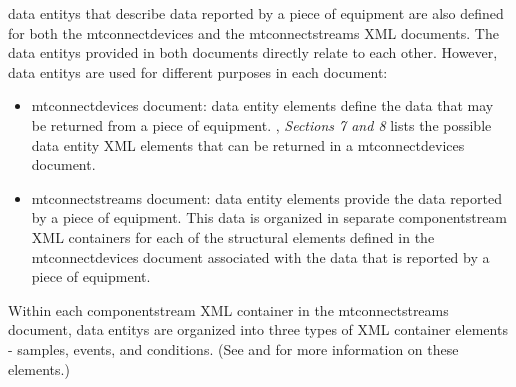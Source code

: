\glspl{data entity} that describe data reported by a piece of equipment are also defined for both the \gls{mtconnectdevices} and the \gls{mtconnectstreams} XML documents.  The \glspl{data entity} provided in both documents directly relate to each other.  However, \glspl{data entity} are used for different purposes in each document:

\begin{itemize}
\item \gls{mtconnectdevices} document: \gls{data entity} elements define the data that may be returned from a piece of equipment.  , \textit{Sections 7 and 8} lists the possible \gls{data entity} XML elements that can be returned in a \gls{mtconnectdevices} document.  

\item \gls{mtconnectstreams} document: \gls{data entity} elements provide the data reported by a piece of equipment.  This data is organized in separate \gls{componentstream} XML containers for each of the \glspl{structural element} defined in the \gls{mtconnectdevices} document associated with the data that is reported by a piece of equipment.  
\end{itemize}

Within each \gls{componentstream} XML container in the \gls{mtconnectstreams} document, \glspl{data entity} are organized into three types of XML container elements - \glspl{sample}, \glspl{event}, and \glspl{condition}.  (See  and  for more information on these elements.)



